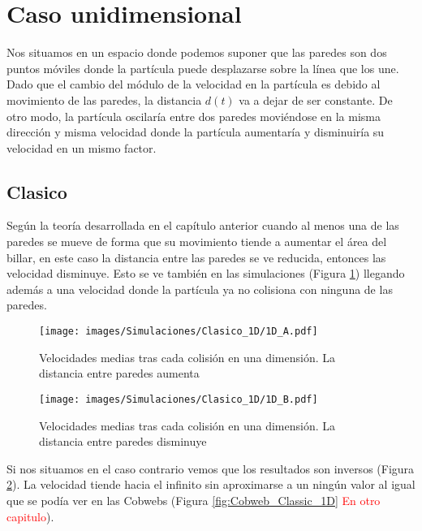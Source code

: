 \documentclass[11pt, spanish]{book}
\begin{document}
\section{Caso unidimensional}

Nos situamos en un espacio donde podemos suponer que las paredes son dos puntos móviles donde la partícula puede desplazarse sobre la línea que los une. Dado que el cambio del módulo de la  velocidad en la partícula es debido al movimiento de las paredes, la distancia \( d(t) \) va a dejar de ser constante. De otro modo, la partícula oscilaría entre dos paredes moviéndose en la misma dirección y misma velocidad donde la partícula aumentaría y disminuiría su velocidad en un mismo factor. 

\subsection{Clasico}

Según la teoría desarrollada en el capítulo anterior cuando al menos una de las paredes se mueve de forma que su movimiento tiende a aumentar el área del billar, en este caso la distancia entre las paredes se ve reducida, entonces las velocidad disminuye. Esto se ve también en las simulaciones (Figura \ref{fig:1D_A}) llegando además a una velocidad donde la partícula ya no colisiona con ninguna de las paredes. 

\begin{figure}[H]
    \centering
    \texttt{[image: images/Simulaciones/Clasico\_1D/1D\_A.pdf]}
    \caption{Velocidades medias tras cada colisión en una dimensión. La distancia entre paredes aumenta}
    \label{fig:1D_A}
\end{figure}


\begin{figure}[H]
    \centering
    \texttt{[image: images/Simulaciones/Clasico\_1D/1D\_B.pdf]}
    \caption{Velocidades medias tras cada colisión en una dimensión. La distancia entre paredes disminuye}
    \label{fig:1D_B}
\end{figure}

Si nos situamos en el caso contrario vemos que los resultados son inversos (Figura \ref{fig:1D_B}). La velocidad tiende hacia el infinito sin aproximarse a un ningún valor al igual que se podía ver en las Cobwebs (Figura \ref{fig:Cobweb_Classic_1D} \textcolor{red}{En otro capitulo}). 

\vspace{3mm}
\end{document}
